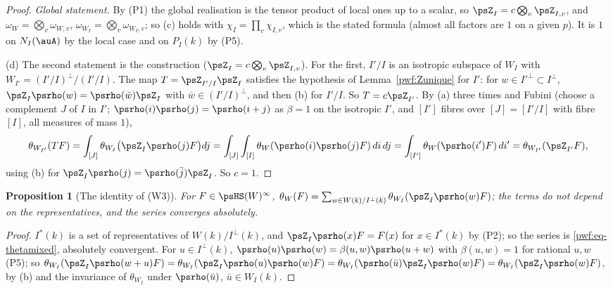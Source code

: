 \documentclass[10pt]{amsart}
\newtheorem{proposition}[theorem]{Proposition}
\theoremstyle{definition}
\theoremstyle{remark}
\begin{document}
\begin{proof}
\emph{Global statement.} By (P1) the global realisation is the tensor product of local ones up to a
scalar, so $\psZ_I=c\bigotimes_v\psZ_{I,v}$, and $\omega_W=\bigotimes_v\omega_{W,v}$,
$\omega_{W_I}=\bigotimes_v\omega_{W_I,v}$; so (c) holds with $\chi_I=\prod_v\chi_{I,v}$, which is the
stated formula (almost all factors are $1$ on a given $p$). It is $1$ on $N_I(\auA)$ by the local
case and on $P_I(k)$ by (P5).

(d) The second statement is the construction ($\psZ_I=c\bigotimes_v\psZ_{I,v}$). For the first,
$I'/I$ is an isotropic subspace of $W_I$ with $W_{I'}=(I'/I)^\perp/(I'/I)$. The map
$T=\psZ_{I'/I}\psZ_I$ satisfies the hypothesis of Lemma~\ref{pwf:Zunique} for $I'$: for $w\in
I'^\perp\subset I^\perp$, $\psZ_I\psrho(w)=\psrho(\bar w)\psZ_I$ with $\bar w\in(I'/I)^\perp$, and then
(b) for $I'/I$. So $T=c\psZ_{I'}$. By (a) three times and Fubini (choose a complement $J$ of $I$ in
$I'$; $\psrho(i)\psrho(j)=\psrho(i+j)$ as $\beta=1$ on the isotropic $I'$, and $[I']$ fibres over
$[J]=[I'/I]$ with fibre $[I]$, all measures of mass $1$),
\[
\theta_{W_{I'}}(TF)=\int_{[J]}\theta_{W_I}\bigl(\psZ_I\psrho(j)F\bigr)dj=\int_{[J]}\int_{[I]}
\theta_W(\psrho(i)\psrho(j)F)\,di\,dj=\int_{[I']}\theta_W(\psrho(i')F)\,di'=\theta_{W_{I'}}(\psZ_{I'}F),
\]
using (b) for $\psZ_I\psrho(j)=\psrho(\bar j)\psZ_I$. So $c=1$.
\end{proof}

\begin{proposition}[The identity of (W3)]\label{pwf:W3}
For $F\in\psHS(W)^\infty$, $\theta_W(F)=\sum_{w\in W(k)/I^\perp(k)}\theta_{W_I}(\psZ_I\psrho(w)F)$; the
terms do not depend on the representatives, and the series converges absolutely.
\end{proposition}
\begin{proof}
$I^*(k)$ is a set of representatives of $W(k)/I^\perp(k)$, and $\psZ_I\psrho(x)F=F(x)$ for $x\in
I^*(k)$ by (P2); so the series is \eqref{pwf:eq-thetamixed}, absolutely convergent. For $u\in
I^\perp(k)$, $\psrho(u)\psrho(w)=\beta(u,w)\psrho(u+w)$ with $\beta(u,w)=1$ for rational $u,w$ (P5); so $\theta_{W_I}(\psZ_I\psrho(w+u)F)=
\theta_{W_I}(\psZ_I\psrho(u)\psrho(w)F)=\theta_{W_I}(\psrho(\bar u)\psZ_I\psrho(w)F)=\theta_{W_I}(\psZ_I
\psrho(w)F)$, by (b) and the invariance of $\theta_{W_I}$ under $\psrho(\bar u)$, $\bar u\in W_I(k)$.
\end{proof}
\end{document}

